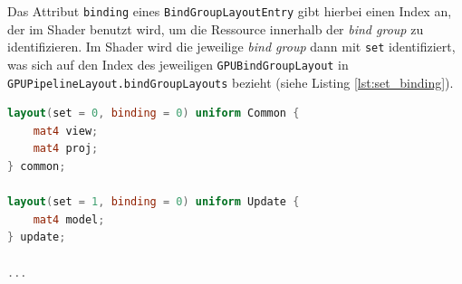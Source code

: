 \documentclass[oneside]{ausarbeitung}
\begin{document}
Das Attribut \texttt{binding} eines \texttt{BindGroupLayoutEntry} gibt hierbei einen Index an, der im Shader benutzt wird, um die Ressource innerhalb der \textit{bind group} zu identifizieren. Im Shader wird die jeweilige \textit{bind group} dann mit \texttt{set} identifiziert, was sich auf den Index des jeweiligen \texttt{GPUBindGroupLayout} in \texttt{GPUPipelineLayout.bindGroupLayouts} bezieht (siehe Listing \ref{lst:set_binding}).

\begin{lstlisting}[language=GLSL, label={lst:set_binding}, caption={Deklaration der Buffer im Shader. \texttt{set} identifiziert hierbei die \textit{bind group}, und \texttt{binding} die Ressource innerhalb der \textit{bind group}.}]
layout(set = 0, binding = 0) uniform Common {
	mat4 view;
	mat4 proj;
} common;

layout(set = 1, binding = 0) uniform Update {
	mat4 model;
} update;

...
\end{lstlisting}
\end{document}
